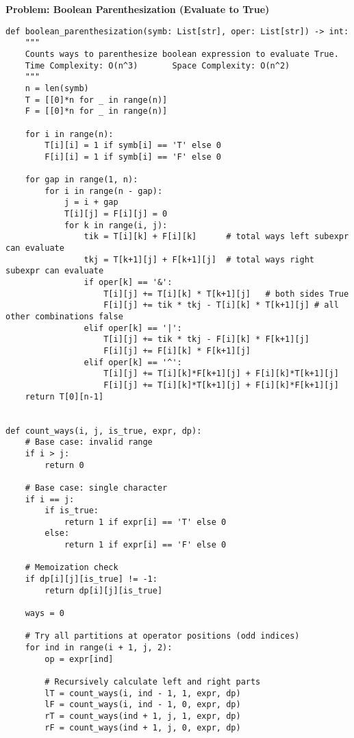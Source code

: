 \noindent\textbf{Problem: Boolean Parenthesization (Evaluate to True)}
\begin{verbatim}
def boolean_parenthesization(symb: List[str], oper: List[str]) -> int:
    """
    Counts ways to parenthesize boolean expression to evaluate True.
    Time Complexity: O(n^3)       Space Complexity: O(n^2)
    """
    n = len(symb)
    T = [[0]*n for _ in range(n)]
    F = [[0]*n for _ in range(n)]
    
    for i in range(n):
        T[i][i] = 1 if symb[i] == 'T' else 0
        F[i][i] = 1 if symb[i] == 'F' else 0
    
    for gap in range(1, n):
        for i in range(n - gap):
            j = i + gap
            T[i][j] = F[i][j] = 0
            for k in range(i, j):
                tik = T[i][k] + F[i][k]      # total ways left subexpr can evaluate
                tkj = T[k+1][j] + F[k+1][j]  # total ways right subexpr can evaluate
                if oper[k] == '&':
                    T[i][j] += T[i][k] * T[k+1][j]   # both sides True
                    F[i][j] += tik * tkj - T[i][k] * T[k+1][j] # all other combinations false
                elif oper[k] == '|':
                    T[i][j] += tik * tkj - F[i][k] * F[k+1][j]
                    F[i][j] += F[i][k] * F[k+1][j]
                elif oper[k] == '^':
                    T[i][j] += T[i][k]*F[k+1][j] + F[i][k]*T[k+1][j]
                    F[i][j] += T[i][k]*T[k+1][j] + F[i][k]*F[k+1][j]
    return T[0][n-1]


def count_ways(i, j, is_true, expr, dp):
    # Base case: invalid range
    if i > j:
        return 0

    # Base case: single character
    if i == j:
        if is_true:
            return 1 if expr[i] == 'T' else 0
        else:
            return 1 if expr[i] == 'F' else 0

    # Memoization check
    if dp[i][j][is_true] != -1:
        return dp[i][j][is_true]

    ways = 0

    # Try all partitions at operator positions (odd indices)
    for ind in range(i + 1, j, 2):
        op = expr[ind]

        # Recursively calculate left and right parts
        lT = count_ways(i, ind - 1, 1, expr, dp)
        lF = count_ways(i, ind - 1, 0, expr, dp)
        rT = count_ways(ind + 1, j, 1, expr, dp)
        rF = count_ways(ind + 1, j, 0, expr, dp)


\end{verbatim}
